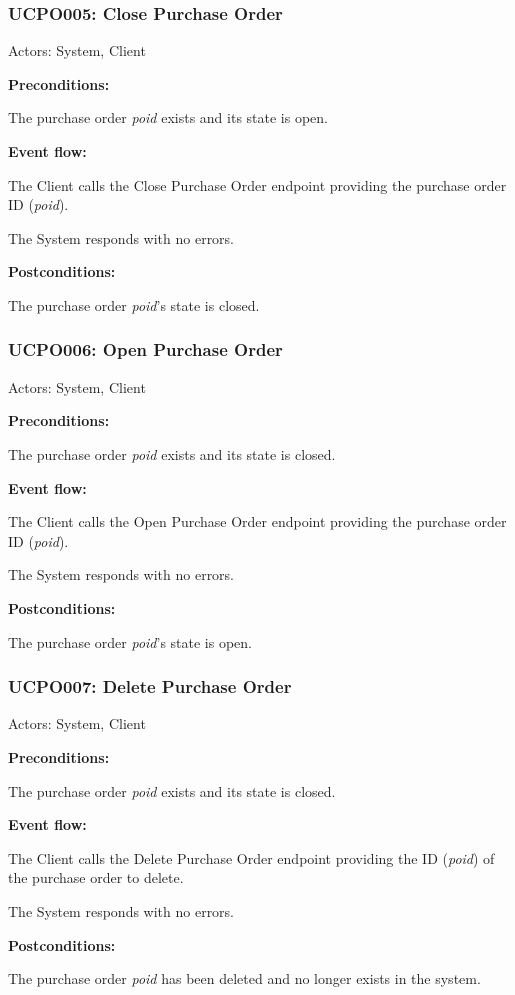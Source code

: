 \begin{ucbox}{\subsubsection{UCPO005: Close Purchase Order}}
\label{UCPO005}

Actors: System, Client

\textbf{Preconditions:}

\ucitem The purchase order \textit{poid} exists and its state is open.

\textbf{Event flow:}

\ucitem The Client calls the Close Purchase Order endpoint providing the purchase order ID (\textit{poid}).

\ucitem The System responds with no errors.

\textbf{Postconditions:}

\ucitem The purchase order \textit{poid}’s state is closed.

\end{ucbox}

\begin{ucbox}{\subsubsection{UCPO006: Open Purchase Order}}
\label{UCPO006}

Actors: System, Client

\textbf{Preconditions:}

\ucitem The purchase order \textit{poid} exists and its state is closed.

\textbf{Event flow:}

\ucitem The Client calls the Open Purchase Order endpoint providing the purchase order ID (\textit{poid}).

\ucitem The System responds with no errors.

\textbf{Postconditions:}

\ucitem The purchase order \textit{poid}’s state is open.

\end{ucbox}

\begin{ucbox}{\subsubsection{UCPO007: Delete Purchase Order}}
\label{UCPO007}

Actors: System, Client

\textbf{Preconditions:}

\ucitem The purchase order \textit{poid} exists and its state is closed.

\textbf{Event flow:}

\ucitem The Client calls the Delete Purchase Order endpoint providing the ID (\textit{poid}) of the purchase order to delete.

\ucitem The System responds with no errors.

\textbf{Postconditions:}

\ucitem The purchase order \textit{poid} has been deleted and no longer exists in the system.

\end{ucbox}

